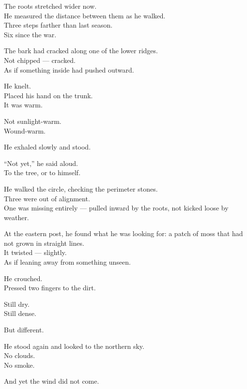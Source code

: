 \documentclass[12pt]{article}
\begin{document}
The roots stretched wider now.\\
He measured the distance between them as he walked.\\
Three steps farther than last season.\\
Six since the war.

The bark had cracked along one of the lower ridges.\\
Not chipped — cracked.\\
As if something inside had pushed outward.

\vspace{1em}

He knelt.\\
Placed his hand on the trunk.\\
It was warm.

Not sunlight-warm.\\
Wound-warm.

He exhaled slowly and stood.

\vspace{1em}

“Not yet,” he said aloud.\\
To the tree, or to himself.

\vspace{1em}

He walked the circle, checking the perimeter stones.\\
Three were out of alignment.\\
One was missing entirely — pulled inward by the roots, not kicked loose by weather.

At the eastern post, he found what he was looking for: a patch of moss that had not grown in straight lines.\\
It twisted — slightly.\\
As if leaning away from something unseen.

\vspace{1em}

He crouched.\\
Pressed two fingers to the dirt.

Still dry.\\
Still dense.

But different.

\vspace{1em}

He stood again and looked to the northern sky.\\
No clouds.\\
No smoke.

And yet the wind did not come.
\end{document}
